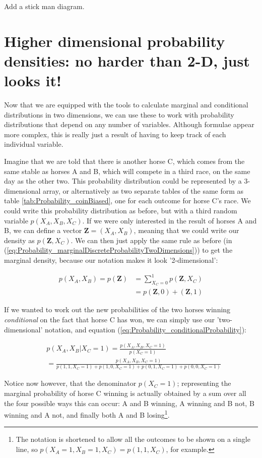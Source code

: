 \documentclass[11pt,fullpage]{book}
\begin{document}
Add a stick man diagram.

\section{Higher dimensional probability densities: no harder than 2-D, just looks it!}
Now that we are equipped with the tools to calculate marginal and conditional distributions in two dimensions, we can use these to work with probability distributions that depend on any number of variables. Although formulae appear more complex, this is really just a result of having to keep track of each individual variable.

Imagine that we are told that there is another horse C, which comes from the same stable as horses A and B, which will compete in a third race, on the same day as the other two. This probability distribution could be represented by a 3-dimensional array, or alternatively as two separate tables of the same form as table \ref{tab:Probability_coinBiased}, one for each outcome for horse C's race. We could write this probability distribution as before, but with a third random variable $p(X_A,X_B,X_C)$. If we were only interested in the result of horses A and B, we can define a vector $\boldsymbol{Z}=(X_A,X_B)$, meaning that we could write our density as $p(\boldsymbol{Z},X_C)$. We can then just apply the same rule as before (in (\ref{eq:Probability_marginalDiscreteProbabilityTwoDimensions})) to get the marginal density, because our notation makes it look '2-dimensional':

\begin{align}\label{eq:Probability_3DDiscreteHorsesExample}
p(X_A,X_B) = p(\boldsymbol{Z}) &= \sum\limits_{X_C=0}^{1} p(\boldsymbol{Z},X_C)\\
&= p(\boldsymbol{Z},0) + (\boldsymbol{Z},1)
\end{align}

If we wanted to work out the new probabilities of the two horses winning \textit{conditional} on the fact that horse C has won, we can simply use our 'two-dimensional' notation, and equation (\ref{eq:Probability_conditionalProbability}):

\begin{align}
&p(X_A, X_B|X_C=1) = \frac{p(X_A,X_B,X_C=1)}{p(X_C=1)}\\
&= \frac{p(X_A,X_B,X_C=1)}{p(1,1,X_C=1) + p(1,0,X_C=1) + p(0,1,X_C=1) + p(0,0,X_C=1)}
\end{align}

Notice now however, that the denominator $p(X_C=1)$; representing the marginal probability of horse C winning is actually obtained by a sum over all the four possible ways this can occur: A and B winning, A winning and B not, B winning and A not, and finally both A and B losing\footnote{The notation is shortened to allow all the outcomes to be shown on a single line, so $p(X_A=1,X_B=1,X_C)=p(1,1,X_C)$, for example.}.
\end{document}
